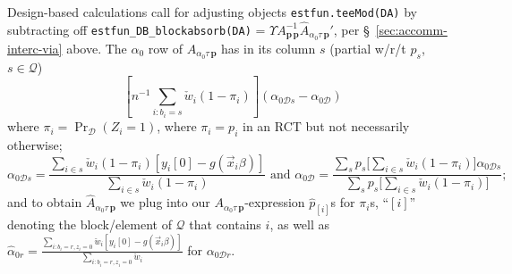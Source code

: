 \documentclass{article}
\newcommand{\owt}[1][{[z_{i}]}]{\ensuremath{\check{w}_{i#1}}}
\newcommand{\AbsorbInterceptsEF}{\Upsilon}
\begin{document}
Design-based calculations call for adjusting objects \texttt{estfun.teeMod(DA)} by subtracting off
\texttt{estfun\_DB\_blockabsorb(DA)} = $\AbsorbInterceptsEF{}
  A_{\mathbf{p}\,\mathbf{p}}^{-1}\hat{A}_{\alpha_{0}\tau\,\mathbf{p}}'$, per \S~\ref{sec:accomm-interc-via}
  above. The $\alpha_{0}$ row of $A_{\alpha_{0}\tau\,\mathbf{p}}$ has in
  its column $s$ (partial w/r/t $p_{s}$, $s \in \mathcal{Q}$)
  \begin{equation*}
  \left[n^{-1}\sum_{i: b_{i}=s}\owt[](1-\pi_{i})\right](\alpha_{0\mathcal{D}s} - \alpha_{0\mathcal{D}})
  \end{equation*}
  where $\pi_{i} = \operatorname{Pr}_{\mathcal{D}}(Z_{i}=1)$, where
  $\pi_{i} = p_{i}$ in an RCT but not necessarily otherwise;
  \begin{equation*}
 \alpha_{0\mathcal{D}s}=
  \frac{\sum_{i \in s}\owt[](1-\pi_{i})[y_{i}[0] -
    g(\vec{x}_{i}\beta)]}{\sum_{i \in s}\owt[](1-\pi_{i})}
  \text{ and }
  \alpha_{0\mathcal{D}} = \frac{\sum_{s}p_{s}\big[\sum_{i \in
      s}\owt[](1-\pi_{i})\big]
    \alpha_{0\mathcal{D}s}}{\sum_{s}p_{s}\big[\sum_{i \in s}\owt[](1-\pi_{i})\big]};
  \end{equation*}
  and to obtain $\hat{A}_{\alpha_{0}\tau\,\mathbf{p}}$ we plug into our
  ${A}_{\alpha_{0}\tau\,\mathbf{p}}$-expression $\hat{p}_{[i]}$s for
  $\pi_{i}$s, ``$[i]$'' denoting the block/element of $\mathcal{Q}$
  that contains $i$, as well as  $\hat{\alpha}_{0 r}=
  \frac{\sum_{i: b_{i}=r, z_{i}=0}\owt[][y_{i}[0] -
    g(\vec{x}_{i}\beta)]}{\sum_{i:b_{i}=r, z_{i}=0}\owt[]}$ for $\alpha_{0\mathcal{D}r}$.
\end{document}
